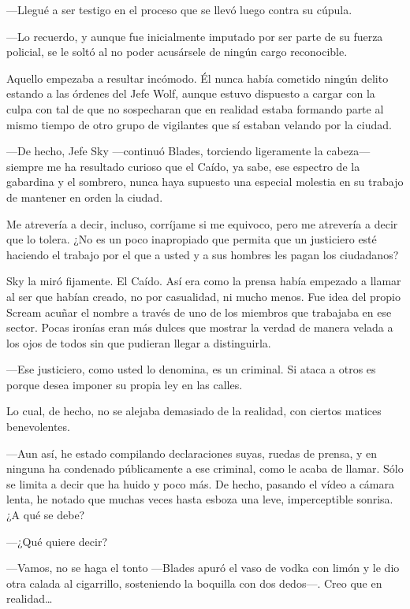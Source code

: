 ---Llegué a ser testigo en el proceso que se llevó luego contra su cúpula.

---Lo recuerdo, y aunque fue inicialmente imputado por ser parte de su fuerza policial, se le soltó al no poder acusársele de ningún cargo reconocible.

Aquello empezaba a resultar incómodo. Él nunca había cometido ningún delito estando a las órdenes del Jefe Wolf, aunque estuvo dispuesto a cargar con la culpa con tal de que no sospecharan que en realidad estaba formando parte al mismo tiempo de otro grupo de vigilantes que sí estaban velando por la ciudad.

---De hecho, Jefe Sky ---continuó Blades, torciendo ligeramente la cabeza--- siempre me ha resultado curioso que el Caído, ya sabe, ese espectro de la gabardina y el sombrero, nunca haya supuesto una especial molestia en su trabajo de mantener en orden la ciudad.

\rquoti{}Me atrevería a decir, incluso, corríjame si me equivoco, pero me atrevería a decir que lo tolera. ¿No es un poco inapropiado que permita que un justiciero esté haciendo el trabajo por el que a usted y a sus hombres les pagan los ciudadanos?

Sky la miró fijamente. El Caído. Así era como la prensa había empezado a llamar al ser que habían creado, no por casualidad, ni mucho menos. Fue idea del propio Scream acuñar el nombre a través de uno de los miembros que trabajaba en ese sector. Pocas ironías eran más dulces que mostrar la verdad de manera velada a los ojos de todos sin que pudieran llegar a distinguirla.

---Ese justiciero, como usted lo denomina, es un criminal. Si ataca a otros es porque desea imponer su propia ley en las calles.

Lo cual, de hecho, no se alejaba demasiado de la realidad, con ciertos matices benevolentes.

---Aun así, he estado compilando declaraciones suyas, ruedas de prensa, y en ninguna ha condenado públicamente a ese criminal, como le acaba de llamar. Sólo se limita a decir que ha huido y poco más. De hecho, pasando el vídeo a cámara lenta, he notado que muchas veces hasta esboza una leve, imperceptible sonrisa. ¿A qué se debe?

---¿Qué quiere decir?

---Vamos, no se haga el tonto ---Blades apuró el vaso de vodka con limón y le dio otra calada al cigarrillo, sosteniendo la boquilla con dos dedos---. Creo que en realidad\dots{}

